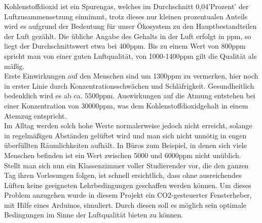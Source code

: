 
\label{Einleitung}
Kohlenstoffdioxid ist ein Spurengas, welches im Durchschnitt 0,04'Prozent' der Luftzusammensetzung einnimmt, trotz dieses nur kleinen prozentualen Anteils wird es aufgrund der Bedeutung für unser Ökosystem zu den Hauptbestandteilen der Luft gezählt. Die übliche Angabe des Gehalts in der Luft erfolgt in ppm, so liegt der Durchschnittswert etwa bei 400ppm. Bis zu einem Wert von 800ppm spricht man von einer guten Luftqualität, von 1000-1400ppm gilt die Qualität als mäßig.\\
Erste Einwirkungen auf den Menschen sind um 1300ppm zu vermerken, hier noch in erster Linie durch Konzentrationsschwächen und Schläfrigkeit. Gesundheitlich bedenklich wird es ab ca. 5500ppm. Auswirkungen auf die Atmung entstehen bei einer Konzentration von 30000ppm, was dem Kohlenstoffdioxidgehalt in einem Atemzug entspricht.\\
Im Alltag werden solch hohe Werte normalerweise jedoch nicht erreicht, solange in regelmäßigen Abständen gelüftet wird und man sich nicht unnötig in engen überfüllten Räumlichkeiten aufhält. In Büros zum Beispiel, in denen sich viele Menschen befinden ist ein Wert zwischen 5000 und 6000ppm nicht unüblich.\\
Stellt man sich nun ein Klassenzimmer voller Studierender vor, die den ganzen Tag ihren Vorlesungen folgen, ist schnell ersichtlich, dass ohne ausreichendes Lüften keine geeigneten Lehrbedingungen geschaffen werden können. Um dieses Problem anzugehen wurde in diesem Projekt ein CO2-gesteuerter Fensterheber, mit Hilfe eines Arduinos, simuliert. Durch diesen soll es möglich sein optimale Bedingungen im Sinne der Luftqualität bieten zu können. \\